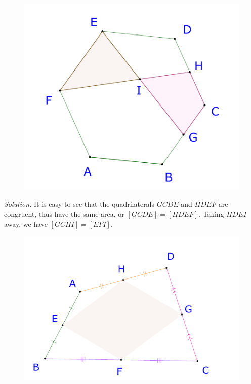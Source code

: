 \begin{multicols}{2}
\begin{figure}[H]
		\includegraphics[width= 1\linewidth]{23-24-s3-i-p4.pdf}
		\vspace*{-10pt}
	\end{figure}
	\textit{Solution.}
		It is easy to see that the quadrilaterals $GCDE$ and $HDEF$ are congruent, thus have the same area, or $[GCDE] = [HDEF].$
		Taking $HDEI$ away, we have $[GCHI] = [EFI].$ 
	\vskip 0.2cm
	\begin{figure}[H]
		\vspace*{-5pt}
		\centering
		\captionsetup{labelformat= empty, justification=centering}
		\includegraphics[width= 1\linewidth]{23-24-s3-i-p5.pdf}

\end{figure}
\end{multicols}
